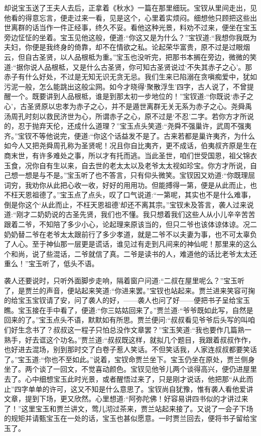 \begin{parag}
    却说宝玉送了王夫人去后，正拿着《秋水》一篇在那里细玩。宝钗从里间走出，见他看的得意忘言，便走过来一看，见是这个，心里着实烦闷。细想他只顾把这些出世离群的话当作一件正经事，终久不妥。看他这种光景，料劝不过来，便坐在宝玉旁边怔怔的坐着。宝玉见他这般，便道:“你这又是为什么？”宝钗道:“我想你我既为夫妇，你便是我终身的倚靠，却不在情欲之私。论起荣华富贵，原不过是过眼烟云，但自古圣贤，以人品根柢为重。”宝玉也没听完，把那书本搁在旁边，微微的笑道:“据你说人品根柢，又是什么古圣贤，你可知古圣贤说过‘不失其赤子之心’。那赤子有什么好处，不过是无知无识无贪无忌。我们生来已陷溺在贪嗔痴爱中，犹如污泥一般，怎么能跳出这般尘网。如今才晓得‘聚散浮生’四字，古人说了，不曾提醒一个。既要讲到人品根柢，谁是到那太初一步地位的！”宝钗道:“你既说‘赤子之心’，古圣贤原以忠孝为赤子之心，并不是遁世离群无关无系为赤子之心。尧舜禹汤周孔时刻以救民济世为心，所谓赤子之心，原不过是‘不忍’二字。若你方才所说的，忍于抛弃天伦，还成什么道理？”宝玉点头笑道:“尧舜不强巢许，武周不强夷齐。”宝钗不等他说完，便道:“你这个话益发不是了。古来若都是巢许夷齐，为什么如今人又把尧舜周孔称为圣贤呢！况且你自比夷齐，更不成话，伯夷叔齐原是生在商末世，有许多难处之事，所以才有托而逃。当此圣世，咱们世受国恩，祖父锦衣玉食，况你自有生以来，自去世的老太太以及老爷太太视如珍宝。你方才所说，自己想一想是与不是。”宝玉听了也不答言，只有仰头微笑。宝钗因又劝道:“你既理屈词穷，我劝你从此把心收一收，好好的用用功。但能搏得一第，便是从此而止，也不枉天恩祖德了。”宝玉点了点头，叹了口气说道:“一第呢，其实也不是什么难事，倒是你这个‘从此而止，不枉天恩祖德’却还不离其宗。”宝钗未及答言，袭人过来说道:“刚才二奶奶说的古圣先贤，我们也不懂。我只想着我们这些人从小儿辛辛苦苦跟着二爷，不知陪了多少小心，论起理来原该当的，但只二爷也该体谅体谅。况二奶奶替二爷在老爷太太跟前行了多少孝道，就是二爷不以夫妻为事，也不可太辜负了人心。至于神仙那一层更是谎话，谁见过有走到凡间来的神仙呢！那里来的这么个和尚，说了些混话，二爷就信了真。二爷是读书的人，难道他的话比老爷太太还重么！”宝玉听了，低头不语。
\end{parag}


\begin{parag}
    袭人还要说时，只听外面脚步走响，隔着窗户问道:“二叔在屋里呢么？”宝玉听了，是贾兰的声音，便站起来笑道:“你进来罢。”宝钗也站起来。贾兰进来笑容可掬的给宝玉宝钗请了安，问了袭人的好，——袭人也问了好——便把书子呈给宝玉瞧。宝玉接在手中看了，便道:“你三姑姑回来了。”贾兰道:“爷爷既如此写，自然是回来的了。”宝玉点头不语，默默如有所思。贾兰便问:“叔叔看见爷爷后头写的叫咱们好生念书了？叔叔这一程子只怕总没作文章罢？”宝玉笑道:“我也要作几篇熟一熟手，好去诓这个功名。”贾兰道:“叔叔既这样，就拟几个题目，我跟着叔叔作作，也好进去混场，别到那时交了白卷子惹人笑话。不但笑话我，人家连叔叔都要笑话了。”宝玉道:“你也不至如此。”说着，宝钗命贾兰坐下。宝玉仍坐在原处，贾兰侧身坐了。两个谈了一回文，不觉喜动颜色。宝钗见他爷儿两个谈得高兴，便仍进屋里去了。心中细想宝玉此时光景，或者醒悟过来了，只是刚才说话，他把那“从此而止”四字单单的许可，这又不知是什么意思了。宝钗尚自犹豫，惟有袭人看他爱讲文章，提到下场，更又欣然。心里想道:“阿弥陀佛！好容易讲四书似的才讲过来了！”这里宝玉和贾兰讲文，莺儿沏过茶来，贾兰站起来接了。又说了一会子下场的规矩并请甄宝玉在一处的话，宝玉也甚似愿意。一时贾兰回去，便将书子留给宝玉了。
\end{parag}



